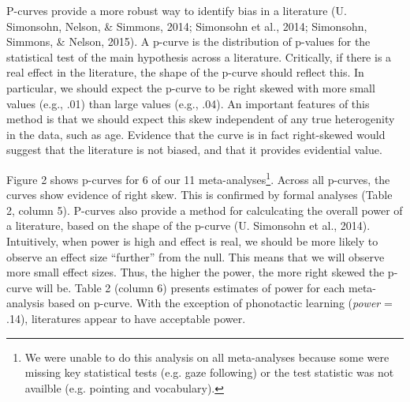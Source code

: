 \documentclass[american,floatsintext,man]{apa6}
\begin{document}
P-curves provide a more robust way to identify bias in a literature (U.
Simonsohn, Nelson, \& Simmons, 2014; Simonsohn et al., 2014; Simonsohn,
Simmons, \& Nelson, 2015). A p-curve is the distribution of p-values for
the statistical test of the main hypothesis across a literature.
Critically, if there is a real effect in the literature, the shape of
the p-curve should reflect this. In particular, we should expect the
p-curve to be right skewed with more small values (e.g., .01) than large
values (e.g., .04). An important features of this method is that we
should expect this skew independent of any true heterogenity in the
data, such as age. Evidence that the curve is in fact right-skewed would
suggest that the literature is not biased, and that it provides
evidential value.

Figure 2 shows p-curves for 6 of our 11
meta-analyses\footnote{We were unable to do this analysis on all meta-analyses because some were missing key statistical tests (e.g. gaze following) or the test statistic was not availble (e.g. pointing and vocabulary).}.
Across all p-curves, the curves show evidence of right skew. This is
confirmed by formal analyses (Table 2, column 5). P-curves also provide
a method for calculcating the overall power of a literature, based on
the shape of the p-curve (U. Simonsohn et al., 2014). Intuitively, when
power is high and effect is real, we should be more likely to observe an
effect size \enquote{further} from the null. This means that we will
observe more small effect sizes. Thus, the higher the power, the more
right skewed the p-curve will be. Table 2 (column 6) presents estimates
of power for each meta-analysis based on p-curve. With the exception of
phonotactic learning (\emph{power} = .14), literatures appear to have
acceptable power.
\end{document}
